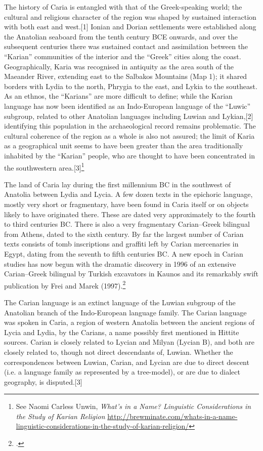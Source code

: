 The history of Caria is entangled with that of the Greek-speaking world; 
the cultural and religious character of the region was shaped by sustained interaction with both east and west.[1] Ionian and Dorian settlements were established along the Anatolian seaboard from the tenth century BCE onwards, and over the subsequent centuries there was sustained contact and assimilation between the \enquote{Karian} communities of the interior and the \enquote{Greek} cities along the coast. Geographically, Karia was recognised in antiquity as the area south of the Maeander River, extending east to the Salbakos Mountains (Map 1); it shared borders with Lydia to the north, Phrygia to the east, and Lykia to the southeast. As an ethnos, the “Karians” are more difficult to define; while the Karian language has now been identified as an Indo-European language of the “Luwic” subgroup, related to other Anatolian languages including Luwian and Lykian,[2] identifying this population in the archaeological record remains problematic. The cultural coherence of the region as a whole is also not assured; the limit of Karia as a geographical unit seems to have been greater than the area traditionally inhabited by the “Karian” people, who are thought to have been concentrated in the southwestern area.[3]\footnote{See Naomi Carless Unwin, \textit{What's in a Name? Linguistic Considerations in the Study of Karian Religion} \protect \url{http://brewminate.com/whats-in-a-name-linguistic-considerations-in-the-study-of-karian-religion/}}

The land of Caria lay during the first millennium BC in the southwest of Anatolia between
Lydia and Lycia. A few dozen texts in the epichoric language, mostly very short or fragmentary,
have been found in Caria itself or on objects likely to have originated there. These
are dated very approximately to the fourth to third centuries BC. There is also a very fragmentary
Carian–Greek bilingual from Athens, dated to the sixth century. By far the largest
number of Carian texts consists of tomb inscriptions and graffiti left by Carian mercenaries
in Egypt, dating from the seventh to fifth centuries BC. A new epoch in Carian studies has
now begun with the dramatic discovery in 1996 of an extensive Carian–Greek bilingual
by Turkish excavators in Kaunos and its remarkably swift publication by Frei and Marek
(1997).\footcite{frei1997}



\label{sec:carian}
The Carian language is an extinct language of the Luwian subgroup of the Anatolian branch of the Indo-European language family. The Carian language was spoken in Caria, a region of western Anatolia between the ancient regions of Lycia and Lydia, by the Carians, a name possibly first mentioned in Hittite sources. Carian is closely related to Lycian and Milyan (Lycian B), and both are closely related to, though not direct descendants of, Luwian. Whether the correspondences between Luwian, Carian, and Lycian are due to direct descent (i.e. a language family as represented by a tree-model), or are due to dialect geography, is disputed.[3]



